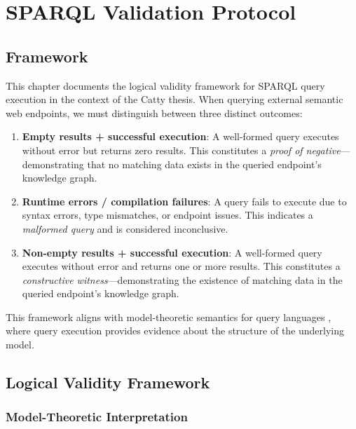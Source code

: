
\chapter{SPARQL Validation Protocol}
\label{sec:sparql-validation-protocol}

\section{Framework}

This chapter documents the logical validity framework for SPARQL query execution in the context of the Catty thesis. When querying external semantic web endpoints, we must distinguish between three distinct outcomes:

\begin{enumerate}
  \item \textbf{Empty results + successful execution}: A well-formed query executes without error but returns zero results. This constitutes a \textit{proof of negative}---demonstrating that no matching data exists in the queried endpoint's knowledge graph.
  \item \textbf{Runtime errors / compilation failures}: A query fails to execute due to syntax errors, type mismatches, or endpoint issues. This indicates a \textit{malformed query} and is considered inconclusive.
  \item \textbf{Non-empty results + successful execution}: A well-formed query executes without error and returns one or more results. This constitutes a \textit{constructive witness}---demonstrating the existence of matching data in the queried endpoint's knowledge graph.
\end{enumerate}

This framework aligns with model-theoretic semantics for query languages \cite{maclane1971categories}, where query execution provides evidence about the structure of the underlying model.

\section{Logical Validity Framework}

\subsection{Model-Theoretic Interpretation}

